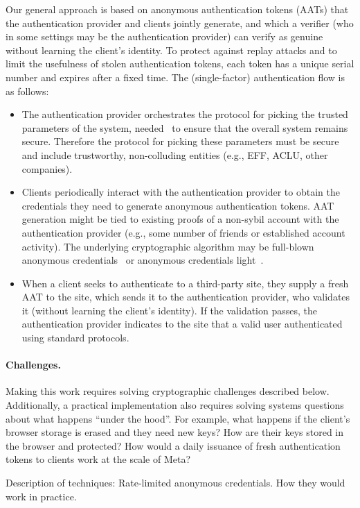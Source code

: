 \documentclass[11pt]{article}
\begin{document}
Our general approach is based on anonymous authentication tokens (AATs) that the authentication provider and clients jointly generate, and which a verifier (who in some settings may be the authentication provider) can verify as genuine without learning the client’s identity. To protect against replay attacks and to limit the usefulness of stolen authentication tokens, each token has a unique serial number and expires after a fixed time. The (single-factor) authentication flow is as follows:
\begin{itemize}
\item The authentication provider orchestrates the protocol for picking the trusted parameters of the system, needed~\cite{lr22} to ensure that the overall system remains secure. Therefore the protocol for picking these parameters must be secure and include trustworthy, non-colluding entities (e.g., EFF, ACLU, other companies). 
\item Clients periodically interact with the authentication provider to obtain the credentials they need to generate anonymous authentication tokens. AAT generation might be tied to existing proofs of a non-sybil account with the authentication provider (e.g., some number of friends or established account activity). The underlying cryptographic algorithm may be full-blown anonymous credentials~\cite{camlys} or anonymous credentials light~\cite{ballys}.
\item When a client seeks to authenticate to a third-party site, they supply a fresh AAT to the site, which sends it to the authentication provider, who validates it (without learning the client’s identity). If the validation passes, the authentication provider indicates to the site that a valid user authenticated using standard protocols.
\end{itemize}

\paragraph{Challenges.} Making this work requires solving cryptographic challenges described below. Additionally, a practical implementation also requires solving systems questions about what happens ``under the hood”. For example, what happens if the client’s browser storage is erased and they need new keys?  How are their keys stored in the browser and protected? How would a daily issuance of fresh authentication tokens to clients work at the scale of Meta?
 
Description of techniques: Rate-limited anonymous credentials.  How they would work in practice.  
 
\end{document}
